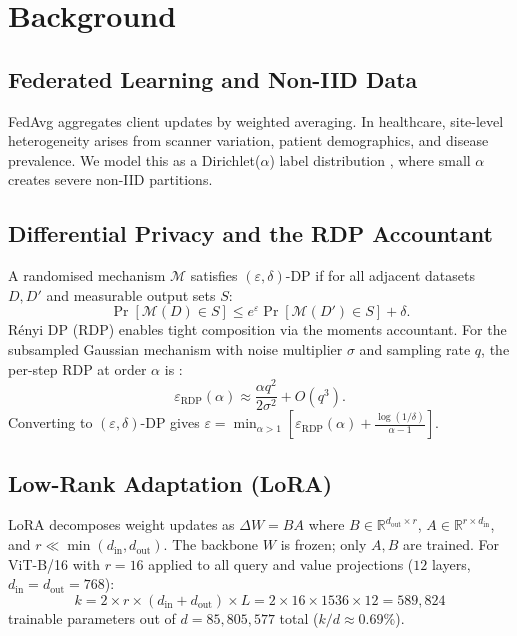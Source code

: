 ﻿\documentclass{article}
\renewcommand{\eps}{\varepsilon}
\newcommand{\noise}{\sigma}
\begin{document}
\section{Background}
\label{sec:background}

\subsection{Federated Learning and Non-IID Data}

FedAvg \citep{mcmahan2017communication} aggregates client
updates by weighted averaging.
In healthcare, site-level heterogeneity arises from scanner variation,
patient demographics, and disease prevalence.
We model this as a Dirichlet($\alpha$) label distribution
\citep{li2020fedprox}, where small $\alpha$ creates severe
non-IID partitions.

\subsection{Differential Privacy and the RDP Accountant}

A randomised mechanism $\mathcal{M}$ satisfies $(\eps, \delta)$-DP
\citep{abadi2016deep} if for all adjacent datasets $D, D'$
and measurable output sets $S$:
\[
  \Pr[\mathcal{M}(D) \in S] \leq e^{\eps} \Pr[\mathcal{M}(D') \in S]
  + \delta.
\]
Rényi DP (RDP) \citep{mironov2017renyi} enables tight
composition via the moments accountant.
For the subsampled Gaussian mechanism with noise multiplier $\noise$ and
sampling rate $q$, the per-step RDP at order $\alpha$ is
\citep{wang2019subsampled}:
\[
  \eps_{\text{RDP}}(\alpha) \approx \frac{\alpha q^2}{2\noise^2}
  + O(q^3).
\]
Converting to $(\eps, \delta)$-DP gives
$\eps = \min_{\alpha > 1} \left[ \eps_{\text{RDP}}(\alpha) +
\frac{\log(1/\delta)}{\alpha - 1} \right]$.

\subsection{Low-Rank Adaptation (LoRA)}

LoRA \citep{hu2022lora} decomposes weight updates as
$\Delta W = BA$ where $B \in \mathbb{R}^{d_{\text{out}} \times r}$,
$A \in \mathbb{R}^{r \times d_{\text{in}}}$, and $r \ll \min(d_{\text{in}},
d_{\text{out}})$.
The backbone $W$ is frozen; only $A, B$ are trained.
For ViT-B/16 with $r{=}16$ applied to all query and value projections
($12$ layers, $d_{\text{in}} {=} d_{\text{out}} {=} 768$):
\[
  k = 2 \times r \times (d_{\text{in}} + d_{\text{out}}) \times L
    = 2 \times 16 \times 1536 \times 12 = 589{,}824
\]
trainable parameters out of $d {=} 85{,}805{,}577$ total
($k/d \approx 0.69\%$).
\end{document}
